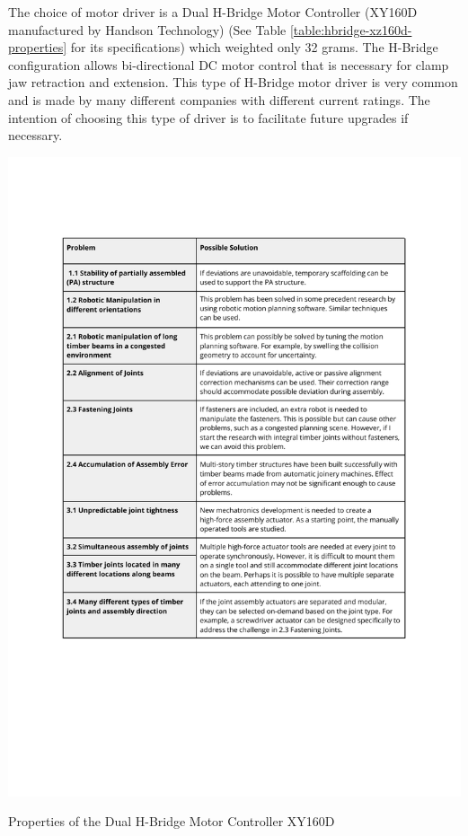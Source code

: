 The choice of motor driver is a Dual H-Bridge Motor Controller (XY160D manufactured by Handson Technology) (See Table \ref{table:hbridge-xz160d-properties} for its specifications) which weighted only 32 grams. The H-Bridge configuration allows bi-directional DC motor control that is necessary for clamp jaw retraction and extension. This type of H-Bridge motor driver is very common and is made by many different companies with different current ratings. The intention of choosing this type of driver is to facilitate future upgrades if necessary.

\begin{table}[]
    \includegraphics[page=4, trim=25.4mm 210mm 25.4mm 33mm, clip, width=\textwidth]{tables/Tables in Chapter 4.pdf}
    \caption{Properties of the Dual H-Bridge Motor Controller XY160D}
    \label{table:hbridge-xz160d-properties}
\end{table}

